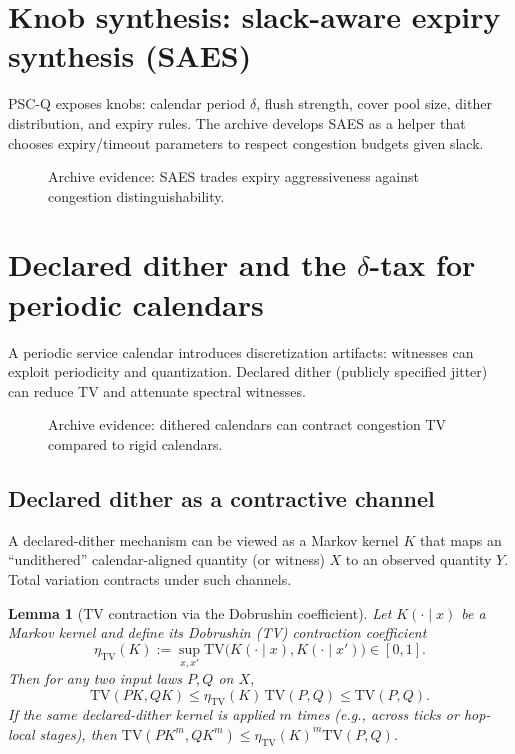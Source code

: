 \documentclass[11pt]{article}
\newtheorem{lemma}{Lemma}
\theoremstyle{definition}
\theoremstyle{remark}
\newcommand{\TV}{\mathrm{TV}}
\begin{document}
\section{Knob synthesis: slack-aware expiry synthesis (SAES)}
PSC-Q exposes knobs: calendar period $\delta$, flush strength, cover pool size, dither distribution, and expiry rules.
The archive develops SAES as a helper that chooses expiry/timeout parameters to respect congestion budgets given slack.

\begin{figure}[t]
\centering
{}
\caption{Archive evidence: SAES trades expiry aggressiveness against congestion distinguishability.}
\label{fig:saes}
\end{figure}

\section{Declared dither and the \texorpdfstring{$\delta$}{delta}-tax for periodic calendars}
A periodic service calendar introduces discretization artifacts: witnesses can exploit periodicity and quantization.
Declared dither (publicly specified jitter) can reduce TV and attenuate spectral witnesses.

\begin{figure}[t]
\centering
{}
\caption{Archive evidence: dithered calendars can contract congestion TV compared to rigid calendars.}
\label{fig:dither}
\end{figure}

\subsection{Declared dither as a contractive channel}
A declared-dither mechanism can be viewed as a Markov kernel \(K\) that maps an ``undithered'' calendar-aligned quantity (or witness) \(X\) to an observed quantity \(Y\).
Total variation contracts under such channels.

\begin{lemma}[TV contraction via the Dobrushin coefficient]\label{lem:dobrushin}
Let \(K(\cdot\mid x)\) be a Markov kernel and define its Dobrushin (TV) contraction coefficient
\[
\eta_{\TV}(K) := \sup_{x,x'} \TV\big(K(\cdot\mid x),K(\cdot\mid x')\big)\in[0,1].
\]
Then for any two input laws \(P,Q\) on \(X\),
\[
\TV(PK,QK)\le \eta_{\TV}(K)\,\TV(P,Q)\le \TV(P,Q).
\]
If the same declared-dither kernel is applied \(m\) times (e.g., across ticks or hop-local stages), then
\(\TV(PK^{m},QK^{m})\le \eta_{\TV}(K)^{m}\TV(P,Q)\).
\end{lemma}
\end{document}
